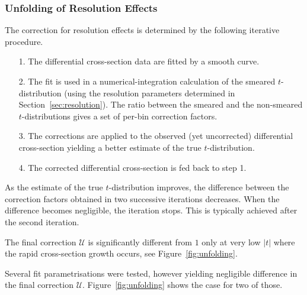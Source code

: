 
\subsubsection{Unfolding of Resolution Effects}
\label{sec:unfolding}

The correction for resolution effects is determined by the following iterative procedure.
\begin{itemize}
\item[1.] The differential cross-section data are fitted by a smooth curve.
\item[2.] The fit is used in a numerical-integration calculation of the smeared $t$-distribution (using the resolution parameters determined in Section~\ref{sec:resolution}). The ratio between the smeared and the non-smeared $t$-distributions gives a set of per-bin correction factors.
\item[3.] The corrections are applied to the observed (yet uncorrected) differential cross-section yielding a better estimate of the true $t$-distribution.
\item[4.] The corrected differential cross-section is fed back to step 1.
\end{itemize}
As the estimate of the true $t$-distribution improves, the difference between the correction factors obtained in two successive iterations decreases. When the difference becomes negligible, the iteration stops. This is typically achieved after the second iteration. 

The final correction $\mathcal{U}$ is significantly different from $1$ only at very low $|t|$ where the rapid cross-section growth occurs, see Figure~\ref{fig:unfolding}.

Several fit parametrisations were tested, however yielding negligible difference in the final correction $\mathcal{U}$. Figure~\ref{fig:unfolding} shows the case for two of those.

